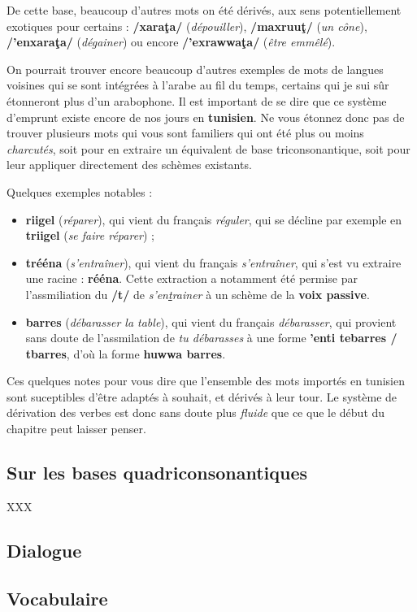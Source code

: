 De cette base, beaucoup d'autres mots on été dérivés, aux sens potentiellement exotiques pour certains : \textbf{/xara\c{t}a/} (\textit{dépouiller}), \textbf{/maxruu\c{t}/} (\textit{un cône}), \textbf{/'enxara\c{t}a/} (\textit{dégainer}) ou encore \textbf{/'exrawwa\c{t}a/} (\textit{être emmêlé}).

On pourrait trouver encore beaucoup d'autres exemples de mots de langues voisines qui se sont intégrées à l'arabe au fil du temps, certains qui je sui sûr étonneront plus d'un arabophone. Il est important de se dire que ce système d'emprunt existe encore de nos jours en \textbf{tunisien}. Ne vous étonnez donc pas de trouver plusieurs mots qui vous sont familiers qui ont été plus ou moins \textit{charcutés}, soit pour en extraire un équivalent de base triconsonantique, soit pour leur appliquer directement des schèmes existants.

Quelques exemples notables : 
\begin{itemize}
    \item \textbf{riigel} (\textit{réparer}), qui vient du français \textit{réguler}, qui se décline par exemple en \textbf{triigel} (\textit{se faire réparer}) ;
    \item \textbf{trééna} (\textit{s'entraîner}), qui vient du français \textit{s'entraîner}, qui s'est vu extraire une racine : \textbf{rééna}. Cette extraction a notamment été permise par l'assmiliation du \textbf{/t/} de \textit{s'en\underline{t}rainer} à un schème de la \textbf{voix passive}.
    \item \textbf{barres} (\textit{débarasser la table}), qui vient du français \textit{débarasser}, qui provient sans doute de l'assmilation de \textit{tu débarasses} à une forme \textbf{'enti tebarres / tbarres}, d'où la forme \textbf{huwwa barres}.
\end{itemize}

Ces quelques notes pour vous dire que l'ensemble des mots importés en tunisien sont suceptibles d'être adaptés à souhait, et dérivés à leur tour. Le système de dérivation des verbes est donc sans doute plus \textit{fluide} que ce que le début du chapitre peut laisser penser.

\subsection{Sur les bases quadriconsonantiques}
XXX

\subsection*{Dialogue}
\subsection*{Vocabulaire}
